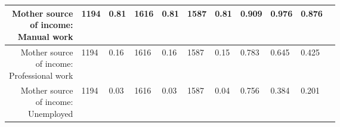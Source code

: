 \begin{longtable}{|r|l|l|l|l|l|l|l|l|l|l}
\hline

	 \makecell{Mother source\\ of income: \\ Manual work}                               & 1194                                                               &  0.81                                                              & 1616                                                               &  0.81                                                              & 1587                                                               &  0.81                                                              & 0.909                                                              & 0.976                                                              & 0.876                                                             \\

\hline

	 \makecell{Mother source\\ of income: \\ Professional work}                         & 1194                                                               &  0.16                                                              & 1616                                                               &  0.16                                                              & 1587                                                               &  0.15                                                              & 0.783                                                              & 0.645                                                              & 0.425                                                             \\

\hline

	 \makecell{Mother source\\ of income: \\ Unemployed}                                & 1194                                                               &  0.03                                                              & 1616                                                               &  0.03                                                              & 1587                                                               &  0.04                                                              & 0.756                                                              & 0.384                                                              & 0.201                                                             \\


\end{longtable}
